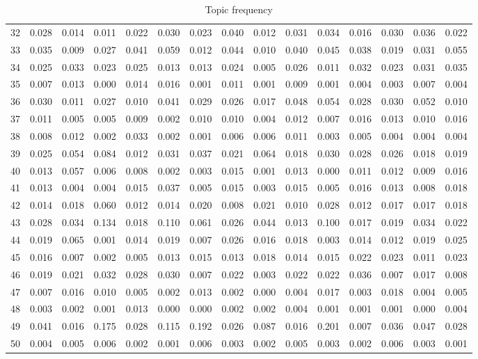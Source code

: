 \begin{table}[ht]
\begin{tabular}{lrrrrrrrrrrrrrr}
  32 & 0.028 & 0.014 & 0.011 & 0.022 & 0.030 & 0.023 & 0.040 & 0.012 & 0.031 & 0.034 & 0.016 & 0.030 & 0.036 & 0.022 \\ 
  33 & 0.035 & 0.009 & 0.027 & 0.041 & 0.059 & 0.012 & 0.044 & 0.010 & 0.040 & 0.045 & 0.038 & 0.019 & 0.031 & 0.055 \\ 
  34 & 0.025 & 0.033 & 0.023 & 0.025 & 0.013 & 0.013 & 0.024 & 0.005 & 0.026 & 0.011 & 0.032 & 0.023 & 0.031 & 0.035 \\ 
  35 & 0.007 & 0.013 & 0.000 & 0.014 & 0.016 & 0.001 & 0.011 & 0.001 & 0.009 & 0.001 & 0.004 & 0.003 & 0.007 & 0.004 \\ 
  36 & 0.030 & 0.011 & 0.027 & 0.010 & 0.041 & 0.029 & 0.026 & 0.017 & 0.048 & 0.054 & 0.028 & 0.030 & 0.052 & 0.010 \\ 
  37 & 0.011 & 0.005 & 0.005 & 0.009 & 0.002 & 0.010 & 0.010 & 0.004 & 0.012 & 0.007 & 0.016 & 0.013 & 0.010 & 0.016 \\ 
  38 & 0.008 & 0.012 & 0.002 & 0.033 & 0.002 & 0.001 & 0.006 & 0.006 & 0.011 & 0.003 & 0.005 & 0.004 & 0.004 & 0.004 \\ 
  39 & 0.025 & 0.054 & 0.084 & 0.012 & 0.031 & 0.037 & 0.021 & 0.064 & 0.018 & 0.030 & 0.028 & 0.026 & 0.018 & 0.019 \\ 
  40 & 0.013 & 0.057 & 0.006 & 0.008 & 0.002 & 0.003 & 0.015 & 0.001 & 0.013 & 0.000 & 0.011 & 0.012 & 0.009 & 0.016 \\ 
  41 & 0.013 & 0.004 & 0.004 & 0.015 & 0.037 & 0.005 & 0.015 & 0.003 & 0.015 & 0.005 & 0.016 & 0.013 & 0.008 & 0.018 \\ 
  42 & 0.014 & 0.018 & 0.060 & 0.012 & 0.014 & 0.020 & 0.008 & 0.021 & 0.010 & 0.028 & 0.012 & 0.017 & 0.017 & 0.018 \\ 
  43 & 0.028 & 0.034 & 0.134 & 0.018 & 0.110 & 0.061 & 0.026 & 0.044 & 0.013 & 0.100 & 0.017 & 0.019 & 0.034 & 0.022 \\ 
  44 & 0.019 & 0.065 & 0.001 & 0.014 & 0.019 & 0.007 & 0.026 & 0.016 & 0.018 & 0.003 & 0.014 & 0.012 & 0.019 & 0.025 \\ 
  45 & 0.016 & 0.007 & 0.002 & 0.005 & 0.013 & 0.015 & 0.013 & 0.018 & 0.014 & 0.015 & 0.022 & 0.023 & 0.011 & 0.023 \\ 
  46 & 0.019 & 0.021 & 0.032 & 0.028 & 0.030 & 0.007 & 0.022 & 0.003 & 0.022 & 0.022 & 0.036 & 0.007 & 0.017 & 0.008 \\ 
  47 & 0.007 & 0.016 & 0.010 & 0.005 & 0.002 & 0.013 & 0.002 & 0.000 & 0.004 & 0.017 & 0.003 & 0.018 & 0.004 & 0.005 \\ 
  48 & 0.003 & 0.002 & 0.001 & 0.013 & 0.000 & 0.000 & 0.002 & 0.002 & 0.004 & 0.001 & 0.001 & 0.001 & 0.000 & 0.004 \\ 
  49 & 0.041 & 0.016 & 0.175 & 0.028 & 0.115 & 0.192 & 0.026 & 0.087 & 0.016 & 0.201 & 0.007 & 0.036 & 0.047 & 0.028 \\ 
  50 & 0.004 & 0.005 & 0.006 & 0.002 & 0.001 & 0.006 & 0.003 & 0.002 & 0.005 & 0.003 & 0.002 & 0.006 & 0.003 & 0.001 \\ 
   \hline
\end{tabular}
\caption{Topic frequency} 
\end{table}
